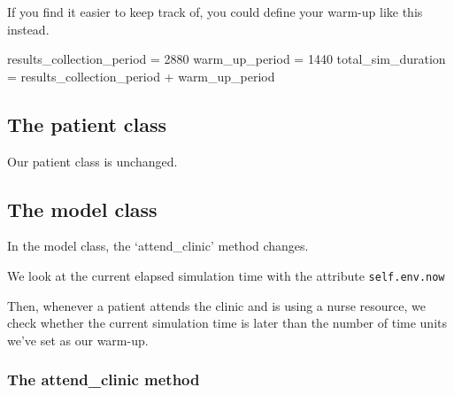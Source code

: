 \documentclass[
  letterpaper,
  DIV=11,
  numbers=noendperiod]{scrreprt}
\newenvironment{Shaded}{\begin{snugshade}}{\end{snugshade}}
\newcommand{\DecValTok}[1]{\textcolor[rgb]{0.68,0.00,0.00}{#1}}
\newcommand{\NormalTok}[1]{\textcolor[rgb]{0.00,0.23,0.31}{#1}}
\newcommand{\OperatorTok}[1]{\textcolor[rgb]{0.37,0.37,0.37}{#1}}
\begin{document}
\begin{tcolorbox}[enhanced jigsaw, rightrule=.15mm, colback=white, colframe=quarto-callout-tip-color-frame, colbacktitle=quarto-callout-tip-color!10!white, toprule=.15mm, coltitle=black, opacityback=0, titlerule=0mm, bottomtitle=1mm, breakable, title=\textcolor{quarto-callout-tip-color}{\faLightbulb}\hspace{0.5em}{Tip}, opacitybacktitle=0.6, toptitle=1mm, arc=.35mm, bottomrule=.15mm, leftrule=.75mm, left=2mm]

If you find it easier to keep track of, you could define your warm-up
like this instead.

\label{g_class_alt}
\begin{Shaded}
\begin{Highlighting}[]
\NormalTok{results\_collection\_period }\OperatorTok{=} \DecValTok{2880}
\NormalTok{warm\_up\_period }\OperatorTok{=} \DecValTok{1440}
\NormalTok{total\_sim\_duration }\OperatorTok{=}\NormalTok{ results\_collection\_period }\OperatorTok{+}\NormalTok{ warm\_up\_period}
\end{Highlighting}
\end{Shaded}

\end{tcolorbox}

\subsection{The patient class}\label{the-patient-class-2}

Our patient class is unchanged.

\subsection{The model class}\label{the-model-class-2}

In the model class, the `attend\_clinic' method changes.

We look at the current elapsed simulation time with the attribute
\texttt{self.env.now}

Then, whenever a patient attends the clinic and is using a nurse
resource, we check whether the current simulation time is later than the
number of time units we've set as our warm-up.

\subsubsection{The attend\_clinic
method}\label{the-attend_clinic-method-1}
\end{document}
